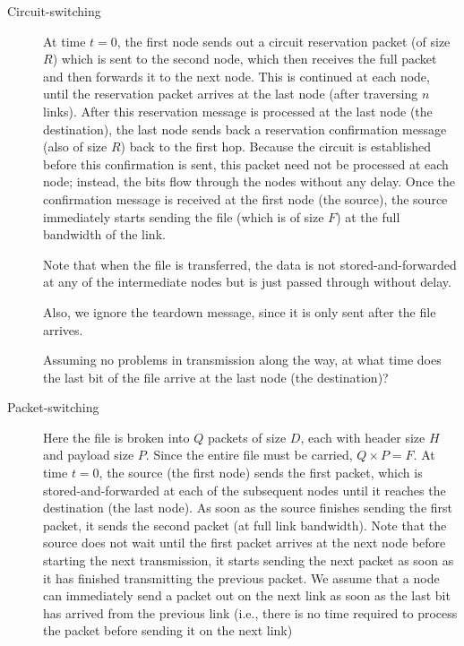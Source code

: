 \documentclass{supervision}
\begin{document}
\begin{questions}
\begin{parts}
        \begin{description}
          \item[Circuit-switching] At time $t = 0$, the first node sends out a
            circuit reservation packet (of size $R$) which is sent to the
            second node, which then receives the full packet and then forwards
            it to the next node. This is continued at each node, until the
            reservation packet arrives at the last node (after traversing $n$
            links). After this reservation message is processed at the last
            node (the destination), the last node sends back a reservation
            confirmation message (also of size $R$) back to the first hop.
            Because the circuit is established before this confirmation is
            sent, this packet need not be processed at each node; instead, the
            bits flow through the nodes without any delay. Once the
            confirmation message is received at the first node (the source),
            the source immediately starts sending the file (which is of size
            $F$) at the full bandwidth of the link.

            Note that when the file is transferred, the data is not
            stored-and-forwarded at any of the intermediate nodes but is just
            passed through without delay.

            Also, we ignore the teardown message, since it is only sent after
            the file arrives.

            \begin{subparts}
              \subpart Assuming no problems in transmission along the way, at
              what time does the last bit of the file arrive at the last node
              (the destination)?
            \end{subparts}

          \item[Packet-switching] Here the file is broken into $Q$ packets of
            size $D$, each with header size $H$ and payload size $P$. Since
            the entire file must be carried, $Q \times P = F$. At time
            $t = 0$, the source (the first node) sends the first packet, which
            is stored-and-forwarded at each of the subsequent nodes until it
            reaches the destination (the last node). As soon as the source
            finishes sending the first packet, it sends the second packet (at
            full link bandwidth). Note that the source does not wait until the
            first packet arrives at the next node before starting the next
            transmission, it starts sending the next packet as soon as it has
            finished transmitting the previous packet. We assume that a node
            can immediately send a packet out on the next link as soon as the
            last bit has arrived from the previous link (i.e., there is no time
            required to process the packet before sending it on the next link)


\end{description}
\end{parts}
\end{questions}
\end{document}
